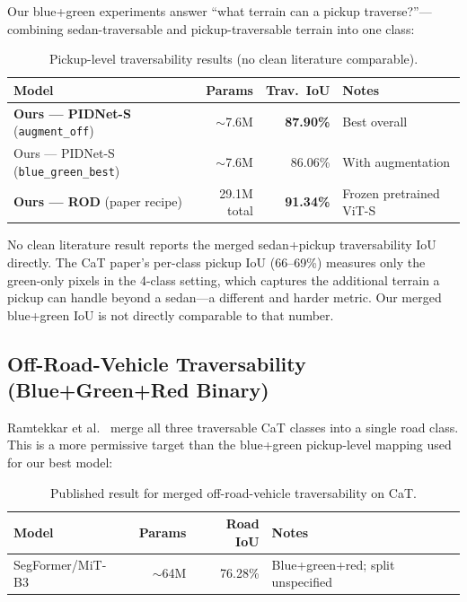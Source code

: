 \documentclass[12pt,a4paper]{report}
\begin{document}
Our blue+green experiments answer ``what terrain can a pickup traverse?''---combining sedan-traversable and pickup-traversable terrain into one class:

\begin{table}[H]
\centering
\caption{Pickup-level traversability results (no clean literature comparable).}
\label{tab:pickup_comparison}
\small
\begin{tabular}{@{}lrrl@{}}
\toprule
\textbf{Model} & \textbf{Params} & \textbf{Trav.\ IoU} & \textbf{Notes} \\
\midrule
\textbf{Ours --- PIDNet-S} (\texttt{augment\_off}) & ${\sim}$7.6M & \textbf{87.90\%} & Best overall \\
Ours --- PIDNet-S (\texttt{blue\_green\_best}) & ${\sim}$7.6M & 86.06\% & With augmentation \\
\textbf{Ours --- ROD} (paper recipe) & 29.1M total & \textbf{91.34\%} & Frozen pretrained ViT-S \\
\bottomrule
\end{tabular}
\end{table}

No clean literature result reports the merged sedan+pickup traversability IoU directly.
The CaT paper's per-class pickup IoU (66--69\%) measures only the green-only pixels in the 4-class setting, which captures the additional terrain a pickup can handle beyond a sedan---a different and harder metric.
Our merged blue+green IoU is not directly comparable to that number.

\subsection{Off-Road-Vehicle Traversability (Blue+Green+Red Binary)}

Ramtekkar et al.~\cite{ramtekkar2024depth} merge all three traversable CaT
classes into a single road class. This is a more permissive target than the
blue+green pickup-level mapping used for our best model:

\begin{table}[H]
\centering
\caption{Published result for merged off-road-vehicle traversability on CaT.}
\label{tab:offroad_level_comparison}
\small
\begin{tabular}{@{}lrrl@{}}
\toprule
\textbf{Model} & \textbf{Params} & \textbf{Road IoU} & \textbf{Notes} \\
\midrule
SegFormer/MiT-B3~\cite{ramtekkar2024depth} & ${\sim}$64M & 76.28\% & Blue+green+red; split unspecified \\
\bottomrule
\end{tabular}
\end{table}
\end{document}
